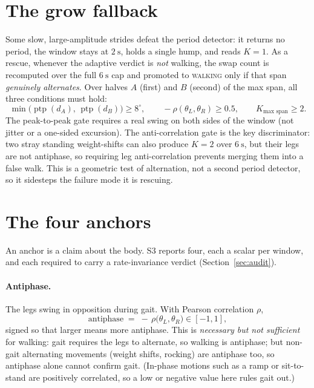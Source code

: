 \documentclass[11pt]{article}
\newcommand{\Lang}{\theta_{L}}          %
\newcommand{\Rang}{\theta_{R}}          %
\newcommand{\degs}{^{\circ}}            %
\newcommand{\ptp}{\operatorname{ptp}}
\newcommand{\corr}{\rho}
\begin{document}
\section{The grow fallback}

Some slow, large-amplitude strides defeat the period detector: it returns no period,
the window stays at $2~\text{s}$, holds a single hump, and reads $K=1$. As a rescue,
whenever the adaptive verdict is \emph{not} walking, the swap count is recomputed over
the full $6~\text{s}$ cap and promoted to \textsc{walking} only if that span
\emph{genuinely alternates}. Over halves $A$ (first) and $B$ (second) of the max span,
all three conditions must hold:
\begin{equation}
\min\big(\ptp(d_A),\, \ptp(d_B)\big) \geq 8\degs,
\qquad
-\corr(\Lang, \Rang) \geq 0.5,
\qquad
K_{\text{max span}} \geq 2.
\end{equation}
The peak-to-peak gate requires a real swing on both sides of the window (not jitter or a
one-sided excursion). The anti-correlation gate is the key discriminator: two stray
standing weight-shifts can also produce $K=2$ over $6~\text{s}$, but their legs are not
antiphase, so requiring leg anti-correlation prevents merging them into a false walk.
This is a geometric test of alternation, not a second period detector, so it sidesteps
the failure mode it is rescuing.

\section{The four anchors}
\label{sec:anchors}

An anchor is a claim about the body. S3 reports four, each a scalar per window, and each
required to carry a rate-invariance verdict (Section~\ref{sec:audit}).

\paragraph{Antiphase.} The legs swing in opposition during gait. With Pearson
correlation $\corr$,
\begin{equation}
\text{antiphase} \;=\; -\,\corr\big(\Lang, \Rang\big) \in [-1, 1],
\end{equation}
signed so that larger means more antiphase. This is \emph{necessary but not sufficient}
for walking: gait requires the legs to alternate, so walking is antiphase; but non-gait
alternating movements (weight shifts, rocking) are antiphase too, so antiphase alone
cannot confirm gait. (In-phase motions such as a ramp or sit-to-stand are positively
correlated, so a low or negative value here rules gait out.)
\end{document}
